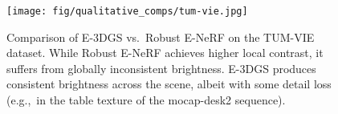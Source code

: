 \begin{figure}[t]
\centering
\texttt{[image: fig/qualitative\_comps/tum-vie.jpg]}
\caption{Comparison of E-3DGS vs.~Robust E-NeRF on the TUM-VIE dataset.
While Robust E-NeRF achieves higher local contrast, it suffers from globally inconsistent brightness. E-3DGS produces consistent brightness across the scene, albeit with some detail loss (e.g.,~in the table texture of the mocap-desk2 sequence).
} 
\label{fig:tumvie_comp}
\end{figure}
